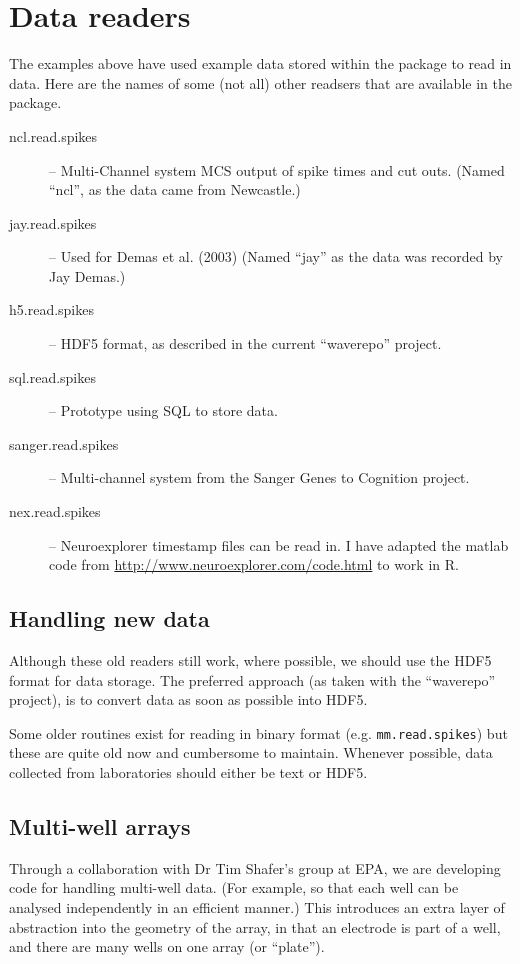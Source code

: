\documentclass{article}\usepackage[]{graphicx}\usepackage[]{color}
\begin{document}
\section*{Data readers}
\label{sec:input}

The examples above have used example data stored within the package to
read in data.  Here are the names of some (not all) other readsers
that are available in the package.
 
\begin{description}
\item[ncl.read.spikes]  -- Multi-Channel system MCS output of spike
  times and cut outs.  (Named ``ncl'', as the data came from Newcastle.)
\item[jay.read.spikes] -- Used for Demas et al. (2003)  (Named ``jay''
  as the data was recorded by Jay Demas.)
\item[h5.read.spikes] -- HDF5 format, as described in the current
  ``waverepo'' project.
\item[sql.read.spikes] -- Prototype using SQL to store data.
\item[sanger.read.spikes] -- Multi-channel system from the Sanger
  Genes to Cognition project.
\item[nex.read.spikes] -- Neuroexplorer timestamp files can be read
  in.  I have adapted the matlab code from
  \url{http://www.neuroexplorer.com/code.html} to work in R.

\end{description}

\subsection*{Handling new data}

Although these old readers still work, where possible, we should use
the HDF5 format for data storage.  The preferred approach (as taken
with the ``waverepo'' project), is to convert data as soon as possible
into HDF5.

Some older routines exist for reading in binary format
(e.g. \texttt{mm.read.spikes}) but these are quite old now and
cumbersome to maintain.  Whenever possible, data collected from
laboratories should either be text or HDF5.

\subsection*{Multi-well arrays}

Through a collaboration with Dr Tim Shafer's group at EPA, we are
developing code for handling multi-well data.  (For example, so that
each well can be analysed independently in an efficient manner.)  This
introduces an extra layer of abstraction into the geometry of the
array, in that an electrode is part of a well, and there are many
wells on one array (or ``plate'').
\end{document}
